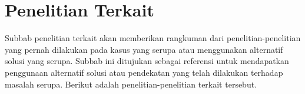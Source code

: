 \section{Penelitian Terkait}
\label{sec:penelitian-terkait}

Subbab penelitian terkait akan memberikan rangkuman dari penelitian-penelitian yang pernah dilakukan pada kasus yang serupa atau menggunakan alternatif solusi yang serupa. Subbab ini ditujukan sebagai referensi untuk mendapatkan penggunaan alternatif solusi atau pendekatan yang telah dilakukan  terhadap masalah serupa. Berikut adalah penelitian-penelitian terkait tersebut. 



